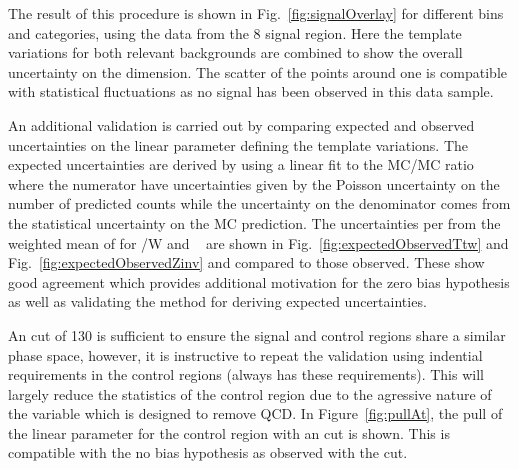 The result of this procedure is shown in Fig.~\ref{fig:signalOverlay} for different 
\scalht bins and categories, using the data from the 8 \TeV signal region. 
Here the template variations for both relevant backgrounds are combined to show 
the overall uncertainty on the \mht dimension. The scatter of the points around 
one is compatible with statistical fluctuations
as no signal has been observed in this data sample.

An additional validation is carried out by comparing expected and observed uncertainties
on the linear parameter defining the template variations.
The expected uncertainties are derived by using a linear fit to the MC/MC ratio where the numerator
have uncertainties given by the Poisson uncertainty on the number of predicted counts while
the uncertainty on the denominator comes from the statistical uncertainty on the
MC prediction. The uncertainties per \GeV from the weighted mean of \mht
for \ttbar/W and \zInv~ are shown in Fig.~\ref{fig:expectedObservedTtw} 
and Fig.~\ref{fig:expectedObservedZinv} and compared to those observed.
These show good agreement which provides additional motivation for the 
zero bias hypothesis as well as validating the method for deriving expected uncertainties.

An \mht cut of 130 \GeV is sufficient to ensure the 
signal and control regions share a similar phase space, however,
it is instructive to repeat the validation using indential \alt 
requirements in the control regions (\gj always has these requirements).
This will largely reduce the statistics of the control 
region due to the agressive nature of the \alt variable which is designed to remove QCD. 
In Figure~\ref{fig:pullAt}, the pull of the linear parameter for the \mj control region
with an \alt cut is shown. This is compatible with the no bias hypothesis as
observed with the \mht cut.


